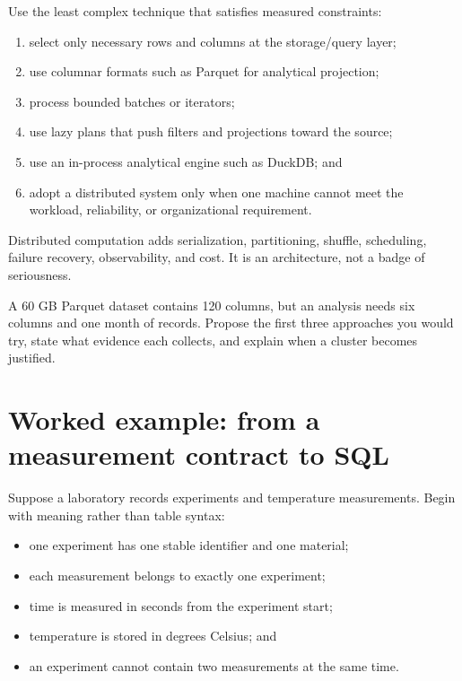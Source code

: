 Use the least complex technique that satisfies measured constraints:

\begin{enumerate}
  \item select only necessary rows and columns at the storage/query layer;
  \item use columnar formats such as Parquet for analytical projection;
  \item process bounded batches or iterators;
  \item use lazy plans that push filters and projections toward the source;
  \item use an in-process analytical engine such as DuckDB; and
  \item adopt a distributed system only when one machine cannot meet the
  workload, reliability, or organizational requirement.
\end{enumerate}

Distributed computation adds serialization, partitioning, shuffle, scheduling,
failure recovery, observability, and cost. It is an architecture, not a badge of
seriousness.

\begin{checkpointbox}
A 60 GB Parquet dataset contains 120 columns, but an analysis needs six columns
and one month of records. Propose the first three approaches you would try,
state what evidence each collects, and explain when a cluster becomes justified.
\end{checkpointbox}

\section{Worked example: from a measurement contract to SQL}

Suppose a laboratory records experiments and temperature measurements. Begin
with meaning rather than table syntax:

\begin{itemize}
  \item one experiment has one stable identifier and one material;
  \item each measurement belongs to exactly one experiment;
  \item time is measured in seconds from the experiment start;
  \item temperature is stored in degrees Celsius; and
  \item an experiment cannot contain two measurements at the same time.
\end{itemize}

